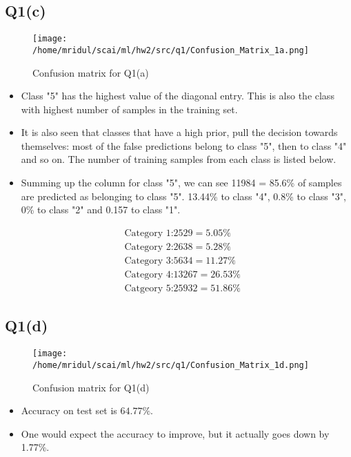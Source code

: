 \documentclass[11pt]{article}
\begin{document}
\subsection{Q1(c)}
\label{sec:org31639fc}
\begin{figure}[!htp]
\centering
\texttt{[image: /home/mridul/scai/ml/hw2/src/q1/Confusion\_Matrix\_1a.png]}
\caption{Confusion matrix for Q1(a)}
\end{figure}
\begin{itemize}
\item Class "5" has the highest value of the diagonal entry. This is also
the class with highest number of samples in the training set.
\item It is also seen that classes that have a high prior, pull the
decision towards themselves: most of the false predictions belong to
class "5", then to class "4" and so on. The number of training
samples from each class is listed below.
\item Summing up the column for class "5", we can see 11984 = 85.6\% of
samples are predicted as belonging to class "5". 13.44\% to class
"4", 0.8\% to class "3", 0\% to class "2" and 0.157 to class "1".
\end{itemize}
\begin{align*}
&\text{Category 1:} 2529 =5.05\%\\
&\text{Category 2:} 2638 =5.28\%\\
&\text{Category 3:} 5634 =11.27\%\\
&\text{Category 4:} 13267 =26.53\%\\
&\text{Catgeory 5:} 25932 =51.86\%
\end{align*}

\subsection{Q1(d)}
\label{sec:orgbd97b51}
\begin{figure}[!htp]
\centering
\texttt{[image: /home/mridul/scai/ml/hw2/src/q1/Confusion\_Matrix\_1d.png]}
\caption{Confusion matrix for Q1(d)}
\end{figure}
\begin{itemize}
\item Accuracy on test set is \(64.77\%\).
\item One would expect the accuracy to improve, but it actually goes down
by 1.77\%.
\end{itemize}
\end{document}
